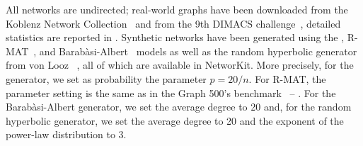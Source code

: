 All networks are undirected; real-world graphs have been downloaded from the
Koblenz Network Collection~\cite{kunegis2013konect} and from the 9th DIMACS
challenge~\cite{demetrescu2009shortest}, detailed statistics are reported in
. Synthetic networks have been generated
using the \erdosr, R-MAT~\cite{DBLP:conf/sdm/ChakrabartiZF04}, and
Barab\`asi-Albert~\cite{barabasi1999emergence} models as well as the random
hyperbolic generator from von Looz \etal~\cite{DBLP:conf/hpec/LoozOLM16}, all
of which are available in NetworKit. More precisely, for the \erdosr generator,
we set as probability the parameter $p = 20 / n$. For R-MAT, the parameter
setting is the same as in the Graph 500's
benchmark~\cite{murphy2010introducing} -- \ie \graphfh.
For the Barab\`asi-Albert generator, we set the average
degree to 20 and, for the random hyperbolic generator, we set the average
degree to 20 and the exponent of the power-law distribution to 3.

